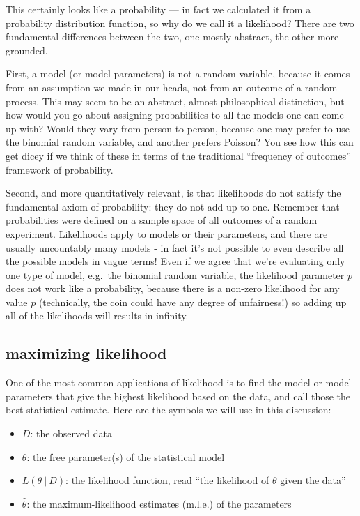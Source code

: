 \documentclass[
  letterpaper,
  DIV=11,
  numbers=noendperiod]{scrreprt}
\providecommand{\tightlist}{%
  \setlength{\itemsep}{0pt}\setlength{\parskip}{0pt}}\usepackage{longtable,booktabs,array}
\begin{document}
This certainly looks like a probability --- in fact we calculated it
from a probability distribution function, so why do we call it a
likelihood? There are two fundamental differences between the two, one
mostly abstract, the other more grounded.

First, a model (or model parameters) is not a random variable, because
it comes from an assumption we made in our heads, not from an outcome of
a random process. This may seem to be an abstract, almost philosophical
distinction, but how would you go about assigning probabilities to all
the models one can come up with? Would they vary from person to person,
because one may prefer to use the binomial random variable, and another
prefers Poisson? You see how this can get dicey if we think of these in
terms of the traditional ``frequency of outcomes'' framework of
probability.

Second, and more quantitatively relevant, is that likelihoods do not
satisfy the fundamental axiom of probability: they do not add up to one.
Remember that probabilities were defined on a sample space of all
outcomes of a random experiment. Likelihoods apply to models or their
parameters, and there are usually uncountably many models - in fact it's
not possible to even describe all the possible models in vague terms!
Even if we agree that we're evaluating only one type of model, e.g.~the
binomial random variable, the likelihood parameter \(p\) does not work
like a probability, because there is a non-zero likelihood for any value
\(p\) (technically, the coin could have any degree of unfairness!) so
adding up all of the likelihoods will results in infinity.

\subsection{maximizing likelihood}\label{maximizing-likelihood}

One of the most common applications of likelihood is to find the model
or model parameters that give the highest likelihood based on the data,
and call those the best statistical estimate. Here are the symbols we
will use in this discussion:

\begin{itemize}
\tightlist
\item
  \(D\): the observed data
\item
  \(\theta\): the free parameter(s) of the statistical model
\item
  \(L(\theta \ \vert \ D)\): the likelihood function, read ``the
  likelihood of \(\theta\) given the data''
\item
  \(\hat{\theta}\): the maximum-likelihood estimates (m.l.e.) of the
  parameters
\end{itemize}
\end{document}
